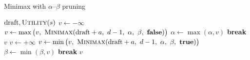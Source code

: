 \documentclass[11pt]{article}
\begin{document}
\newpage
\begin{algorithm}[h!]
\caption{Minimax with $\alpha$–$\beta$ pruning}
\label{alg:alphabeta}
\begin{algorithmic}[1]
        \State \Return $\text{draft}, \textsc{Utility}(s)$
    \EndIf
        \State $v \gets -\infty$
                    \State $v \gets \max\big(v,\ \textsc{Minimax}(\text{draft} + a,\ d-1,\ \alpha,\ \beta,\ \textbf{false})\big)$
                    \State $\alpha \gets \max(\alpha, v)$
                    \If{$\alpha \ge \beta$} \State \textbf{break}
                    \EndIf
                \EndIf
        \EndFor
        \State \Return $v$
    \Else
        \State $v \gets +\infty$
                \State $v \gets \min\big(v,\ \textsc{Minimax}(\text{draft} + a,\ d-1,\ \alpha,\ \beta,\ \textbf{true})\big)$
                \State $\beta \gets \min(\beta, v)$
                \If{$\alpha \ge \beta$} \State \textbf{break}
                \EndIf
            \EndIf
        \EndFor
        \State \Return $v$
    \EndIf
\EndFunction
\end{algorithmic}
\label{alg:minimax}
\end{algorithm}
\end{document}
